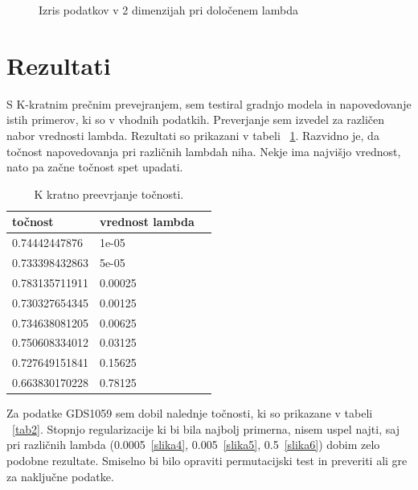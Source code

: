 \documentclass[a4paper,11pt]{article}
\begin{document}
\begin{figure}[htbp]
\begin{center}
\caption{Izris podatkov v 2 dimenzijah pri določenem lambda}
\label{slika3}
\end{center}
\end{figure}




\section{Rezultati}


 S K-kratnim prečnim prevejranjem, sem testiral gradnjo modela in napovedovanje istih primerov, ki so v vhodnih podatkih. Preverjanje sem izvedel za različen nabor vrednosti lambda. Rezultati so prikazani v tabeli ~\ref{tab1}. Razvidno je, da točnost napovedovanja pri različnih lambdah niha. Nekje ima najvišjo vrednost, nato pa začne točnost  spet upadati.

\begin{table}[htbp]
\caption{K kratno preevrjanje točnosti.}
\label{tab1}
\begin{center}
\begin{tabular}{llp{3cm}}
\hline
točnost & vrednost lambda \\
\hline
0.74442447876 & 1e-05 \\
0.733398432863 & 5e-05 \\
0.783135711911 & 0.00025 \\
0.730327654345 & 0.00125 \\
0.734638081205 & 0.00625 \\
0.750608334012 & 0.03125 \\
0.727649151841 & 0.15625 \\
0.663830170228 & 0.78125 \\
\hline
\end{tabular}
\end{center}
\end{table}

Za  podatke GDS1059 sem dobil nalednje točnosti, ki so prikazane v tabeli ~\ref{tab2}. Stopnjo regularizacije ki bi bila najbolj primerna, nisem uspel najti, saj pri različnih lambda (0.0005~\ref{slika4}, 0.005~\ref{slika5}, 0.5~\ref{slika6}) dobim zelo podobne rezultate. Smiselno bi bilo opraviti permutacijski test in preveriti ali gre za naključne podatke.
\end{document}
